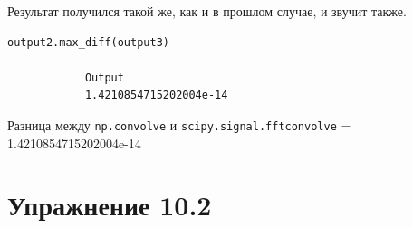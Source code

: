 \documentclass[a4paper,12pt]{article}
\begin{document}
\begin{enumerate}
		Результат получился такой же, как и в прошлом случае, и звучит также.
		\begin{lstlisting}[caption=Используем \texttt{scipy.signal.fftconvolve}]
			output2.max_diff(output3)
			
			Output
			1.4210854715202004e-14
		\end{lstlisting}
	
		 Разница между \texttt{np.convolve} и \texttt{scipy.signal.fftconvolve} = 1.4210854715202004e-14
		
		
	\end{enumerate}
	\newpage
	
	\section{Упражнение 10.2}
	
\end{document}
